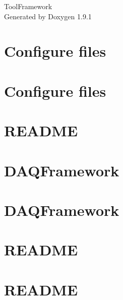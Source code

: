 \let\mypdfximage\pdfximage\def\pdfximage{\immediate\mypdfximage}\documentclass[twoside]{book}
\newcommand{\+}{\discretionary{\mbox{\scriptsize$\hookleftarrow$}}{}{}}
\newcommand{\clearemptydoublepage}{%
  \newpage{\pagestyle{empty}\cleardoublepage}%
}
\begin{document}
\raggedbottom

\hypersetup{pageanchor=false,
             bookmarksnumbered=true,
             pdfencoding=unicode
            }
\begin{titlepage}
\vspace*{7cm}
\begin{center}%
{\Large Tool\+Framework }\\
\vspace*{1cm}
{\large Generated by Doxygen 1.9.1}\\
\end{center}
\end{titlepage}
\clearemptydoublepage
{}
\tableofcontents
\clearemptydoublepage
{}
\hypersetup{pageanchor=true}

\chapter{Configure files}
\label{md_configfiles_README}

\chapter{Configure files}
\label{md_configfiles_template_README}

\chapter{README}
\label{md_DataModel_README}

\chapter{DAQFramework}
\label{md_include_README}

\chapter{DAQFramework}
\label{md_lib_README}

\chapter{README}
\label{md_README}

\chapter{README}
\label{md_src_DataModelBase_README}

\end{document}
